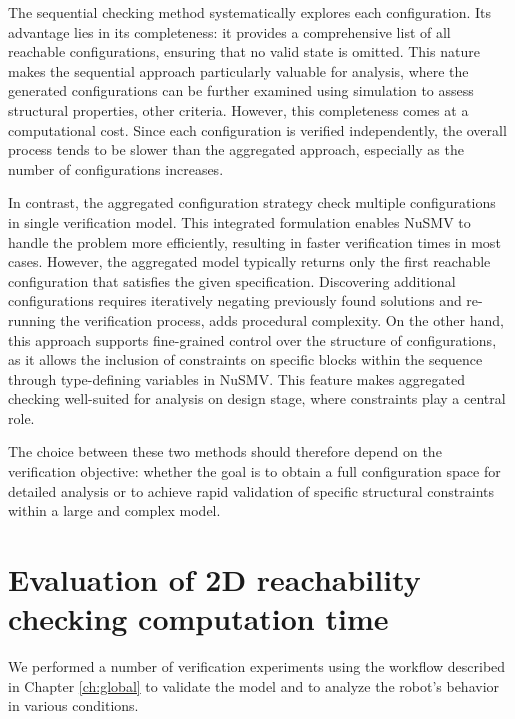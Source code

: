 The sequential checking method systematically explores each configuration.
Its  advantage lies in its completeness: it provides 
a comprehensive list of all reachable configurations, ensuring that no 
valid state is omitted. This  nature makes 
the sequential approach particularly valuable for analysis, where 
the generated configurations can be further examined using simulation 
to assess structural properties, other criteria. 
However, this completeness comes at a computational cost. 
Since each configuration is verified independently, 
the overall process tends to be  slower than the aggregated approach,
especially as the number of configurations increases.

In contrast, the aggregated configuration strategy check multiple 
configurations in single verification model. This integrated formulation 
enables NuSMV to handle the problem more efficiently, resulting in 
faster verification times in most cases. 
However, the aggregated model typically returns only 
the first reachable configuration that satisfies the given specification. 
Discovering additional configurations requires iteratively negating previously 
found solutions and re-running the verification process, adds procedural 
complexity. 
On the other hand, this approach supports fine-grained control 
over the structure of configurations, as it allows the inclusion of 
constraints on specific blocks within the sequence through type-defining 
variables in NuSMV. This feature makes aggregated checking well-suited 
for  analysis on design stage, where constraints  play a central role.

The choice between these two methods should therefore depend on the verification objective: 
whether the goal is to obtain a full configuration space for detailed analysis 
or to achieve rapid validation of specific structural constraints within 
a large and complex model.

\section{Evaluation of 2D reachability checking computation time}

We performed a number of verification experiments using the workflow described in 
Chapter \ref{ch:global} to validate the model and to analyze 
the robot's behavior in various conditions.

